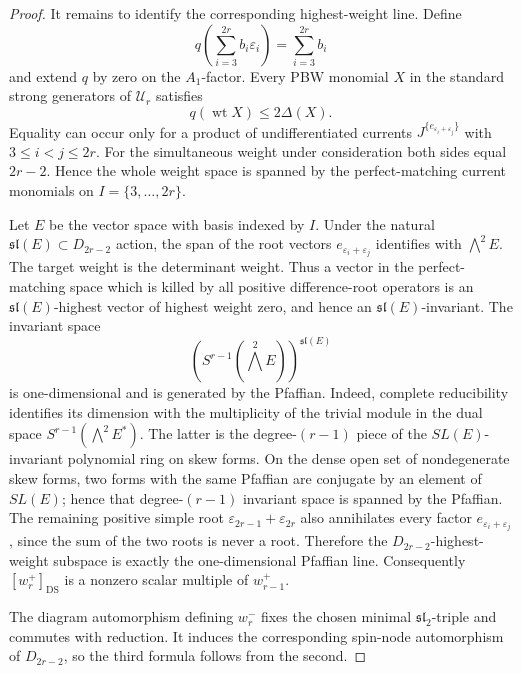 \documentclass[11pt,reqno]{amsart}
\theoremstyle{definition}
\theoremstyle{remark}
\begin{document}
\begin{proof}
It remains to identify the corresponding highest-weight line.  Define
\begin{equation*}
  q\!\left(\sum_{i=3}^{2r}b_i\varepsilon_i\right)
  =\sum_{i=3}^{2r}b_i
\end{equation*}
and extend $q$ by zero on the $A_1$-factor.  Every PBW monomial $X$ in the
standard strong generators of $\mathcal U_r$ satisfies
\begin{equation*}
  q(\operatorname{wt}X)\le2\Delta(X).
\end{equation*}
Equality can occur only for a product of undifferentiated currents
$J^{\{e_{\varepsilon_i+\varepsilon_j}\}}$ with $3\le i<j\le2r$.
For the simultaneous weight under consideration both sides equal
$2r-2$.  Hence the whole weight space is spanned by the perfect-matching
current monomials on $I=\{3,\ldots,2r\}$.

Let $E$ be the vector space with basis indexed by $I$.  Under the natural
$\mathfrak{sl}(E)\subset D_{2r-2}$ action, the span of the root vectors
$e_{\varepsilon_i+\varepsilon_j}$ identifies with $\bigwedge^2E$.  The
target weight is the determinant weight.  Thus a vector in the
perfect-matching space which is killed by all positive difference-root
operators is an $\mathfrak{sl}(E)$-highest vector of highest weight zero,
and hence an $\mathfrak{sl}(E)$-invariant.  The invariant space
\begin{equation*}
 \left(S^{r-1}(\bigwedge^2E)\right)^{\mathfrak{sl}(E)}
\end{equation*}
is one-dimensional and is generated by the Pfaffian.  Indeed, complete
reducibility identifies its dimension with the multiplicity of the trivial
module in the dual space
$S^{r-1}(\bigwedge^2E^*)$.  The latter is the degree-$(r-1)$ piece of the
$SL(E)$-invariant polynomial ring on skew forms.  On the dense open set of
nondegenerate skew forms, two forms with the same Pfaffian are conjugate by
an element of $SL(E)$; hence that degree-$(r-1)$ invariant space is spanned
by the Pfaffian.  The
remaining positive simple root
$\varepsilon_{2r-1}+\varepsilon_{2r}$ also annihilates every factor
$e_{\varepsilon_i+\varepsilon_j}$, since the sum of the two roots is never
a root.  Therefore the $D_{2r-2}$-highest-weight subspace is exactly the
one-dimensional Pfaffian line.  Consequently
$[w_r^+]_{\mathrm{DS}}$ is a nonzero scalar multiple of $w_{r-1}^+$.

The diagram automorphism defining $w_r^-$ fixes the chosen minimal
$\mathfrak{sl}_2$-triple and commutes with reduction.  It induces the
corresponding spin-node automorphism of $D_{2r-2}$, so the third formula
follows from the second.
\end{proof}
\end{document}
